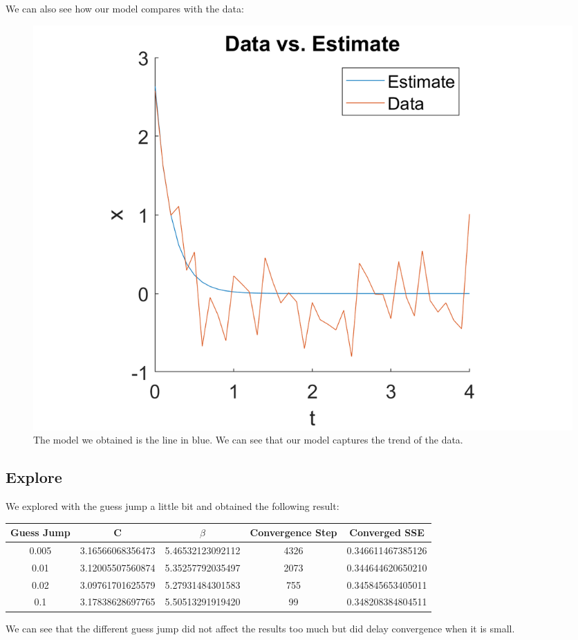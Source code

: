 \documentclass{article}
\begin{document}
\begin{itemize}
We can also see how our model compares with the data:
\begin{figure}[H]
\centering
\includegraphics[scale=0.2]{figures/p_a_data_1.png}
\caption{The model we obtained is the line in blue. We can see that our model captures the trend of the data.}
\end{figure}
\end{itemize}

\subsection{Explore}
We explored with the guess jump a little bit and obtained the following result:
\begin{center}
\begin{tabular}{|c|c|c|c|c|}
\hline
Guess Jump & C & $\beta$ & Convergence Step& Converged SSE\\
\hline
0.005 & 3.16566068356473 & 5.46532123092112 & 4326 & 0.346611467385126\\
0.01 & 3.12005507560874 & 5.35257792035497 & 2073	 & 0.344644620650210\\
0.02 & 3.09761701625579 & 5.27931484301583 & 755 & 0.345845653405011\\
0.1 & 3.17838628697765 & 5.50513291919420 & 99 & 0.348208384804511\\
\hline
\end{tabular}
\end{center}

We can see that the different guess jump did not affect the results too much but did delay convergence when it is small.\\
\end{document}
